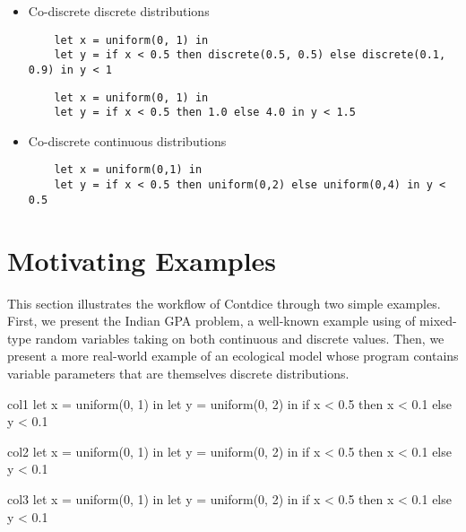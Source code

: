 \documentclass[acmsmall,screen,dvipsnames,x11names,nonacm,anonymous,review]{acmart}
\begin{document}
\begin{itemize}
    \item Co-discrete discrete distributions
    \begin{lstlisting}
    let x = uniform(0, 1) in
    let y = if x < 0.5 then discrete(0.5, 0.5) else discrete(0.1, 0.9) in y < 1
    \end{lstlisting}

    \begin{lstlisting}
    let x = uniform(0, 1) in
    let y = if x < 0.5 then 1.0 else 4.0 in y < 1.5
    \end{lstlisting}

    \item Co-discrete continuous distributions
    \begin{lstlisting}
    let x = uniform(0,1) in 
    let y = if x < 0.5 then uniform(0,2) else uniform(0,4) in y < 0.5
    \end{lstlisting}
\end{itemize}


\section{Motivating Examples}
This section illustrates the workflow of Contdice through two simple examples. First, we present the Indian GPA problem, a well-known example using of mixed-type random variables taking on both continuous and discrete values. Then, we present a more real-world example of an ecological model whose program contains variable parameters that are themselves discrete distributions.


\noindent
\begin{minipage}[t]{0.32\textwidth}
\begin{mybox}[title=Original Program	]{col1}
let x = uniform(0, 1) in
let y = uniform(0, 2) in
if x < 0.5 
   then x < 0.1 
   else y < 0.1
\end{mybox}
\end{minipage}
\hfill
\begin{minipage}[t]{0.32\textwidth}
\begin{mybox}[title=Type Annotations]{col2}
let x = uniform(0, 1) in
let y = uniform(0, 2) in
if x < 0.5 
   then x < 0.1 
   else y < 0.1
\end{mybox}
\end{minipage}
\hfill
\begin{minipage}[t]{0.32\textwidth}
\begin{mybox}[title=Discretized Program]{col3}
let x = uniform(0, 1) in
let y = uniform(0, 2) in
if x < 0.5 
   then x < 0.1 
   else y < 0.1
\end{mybox}
\end{minipage}
\end{document}
